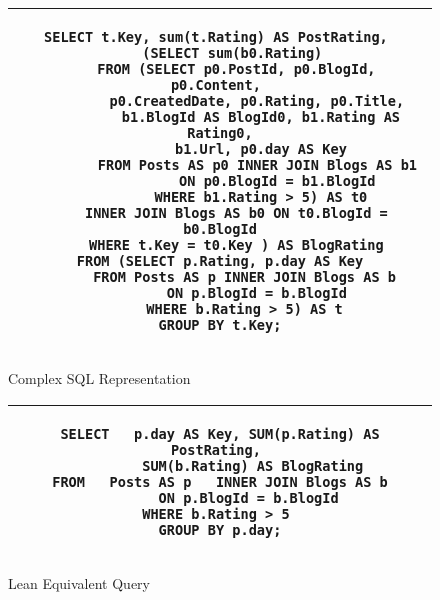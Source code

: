 \begin{figure}[!h]
\centering
{\small
    \centering
    \begin{tabular}{|c|}
        \hline
        \renewcommand{\baselinestretch}{0.9}\selectfont
\begin{lstlisting}
SELECT t.Key, sum(t.Rating) AS PostRating, 
   (SELECT sum(b0.Rating)
    FROM (SELECT p0.PostId, p0.BlogId, p0.Content, 
          p0.CreatedDate, p0.Rating, p0.Title, 
          b1.BlogId AS BlogId0, b1.Rating AS Rating0,
          b1.Url, p0.day AS Key
          FROM Posts AS p0 INNER JOIN Blogs AS b1  
              ON p0.BlogId = b1.BlogId
          WHERE b1.Rating > 5) AS t0
    INNER JOIN Blogs AS b0 ON t0.BlogId = b0.BlogId
    WHERE t.Key = t0.Key ) AS BlogRating
FROM (SELECT p.Rating, p.day AS Key
      FROM Posts AS p INNER JOIN Blogs AS b
         ON p.BlogId = b.BlogId
      WHERE b.Rating > 5) AS t
GROUP BY t.Key;
        \end{lstlisting}\renewcommand{\baselinestretch}{1.0}\selectfont \\
        \hline
\end{tabular}
}
\caption{Complex SQL Representation}\vspace*{0.1in}
\label{fig:BloatedQuery}
{\small
    \centering
    \begin{tabular}{|c|}
        \hline
        \renewcommand{\baselinestretch}{0.9}\selectfont
        \begin{lstlisting}
SELECT   p.day AS Key, SUM(p.Rating) AS PostRating, 
         SUM(b.Rating) AS BlogRating 
FROM   Posts AS p   INNER JOIN Blogs AS b
        ON p.BlogId = b.BlogId 
WHERE b.Rating > 5 
GROUP BY p.day;
        \end{lstlisting} \renewcommand{\baselinestretch}{1.0}\selectfont\\
        \hline
\end{tabular}
}
\caption{Lean Equivalent Query}
\label{fig:LeanQuery}
\end{figure}
